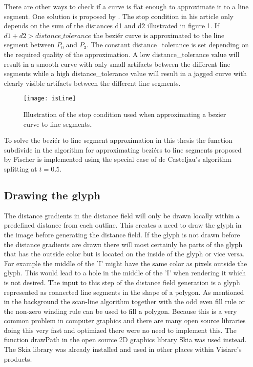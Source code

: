There are other ways to check if a curve is flat enough to approximate it to a line segment. One solution is proposed by \citet{bezier_subdivision}. The stop condition in his article only depends on the sum of the distances d1 and d2 illustrated in figure \ref{fig:isLine}. If $d1+d2>distance\_tolerance$ the beziér curve is approximated to the line segment between $P_0$ and $P_3$. The constant distance\_tolerance is set depending on the required quality of the approximation. A low distance\_tolerance value will result in a smooth curve with only small artifacts between the different line segments while a high distance\_tolerance value will result in a jagged curve with clearly visible artifacts between the different line segments.

\begin{figure}[H]
\texttt{[image: isLine]}
\caption{Illustration of the stop condition used when approximating a bezier curve to line segments.}
\label{fig:isLine}
\end{figure}

To solve the beziér to line segment approximation in this thesis the function subdivide in the algorithm for approximating beziérs to line segments proposed by Fischer is implemented using the special case of de Casteljau's algorithm splitting at $t=0.5$.  
\subsection{Drawing the glyph}
The distance gradients in the distance field will only be drawn locally within a predefined distance from each outline. This creates a need to draw the glyph in the image before generating the distance field. If the glyph is not drawn before the distance gradients are drawn there will most certainly be parts of the glyph that has the outside color but is located on the inside of the glyph or vice versa. For example the middle of the 'I' might have the same color as pixels outside the glyph. This would lead to a hole in the middle of the 'I' when rendering it which is not desired. The input to this step of the distance field generation is a glyph represented as connected line segments in the shape of a polygon. As mentioned in the background the scan-line algorithm together with the odd even fill rule or the non-zero winding rule can be used to fill a polygon. Because this is a very common problem in computer graphics and there are many open source libraries doing this very fast and optimized there were no need to implement this. The function drawPath in the open source 2D graphics library Skia was used instead. The Skia library was already installed and used in other places within Visiarc's products.
